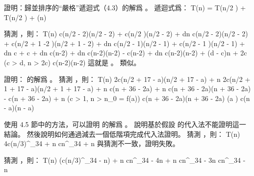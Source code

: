 \startEXERCISE
證明：歸並排序的“嚴格”遞迴式（4.3）的解爲 。
\stopEXERCISE
\startANSWER
遞迴式爲：
\startformula
T(n) = T(\lfloor n/2 \rfloor) + T(\lceil n/2 \rceil) + \Theta(n)
\stopformula

猜測 ，則：
\startformula\startalign
\NC T(n) \NC \le c(\lfloor n/2 \rfloor - 2)\lg(\lfloor n/2 \rfloor - 2) + c(\lceil n/2  )\lg(\lceil n/2 \rceil - 2) + dn \NR
\NC      \NC \le c(n/2 - 2)\lg(n/2 - 2) + c(n/2 + 1 -2 )\lg(n/2 + 1 - 2) + dn \NR
\NC      \NC \le c(n/2 - 1)\lg(n/2 - 1) + c(n/2 - 1 )\lg(n/2 - 1) + dn \NR
\NC      \NC \le c\lg{} + c\lg{} + dn \NR
\NC      \NC \le c(n-2)\lg{} + dn \NR
\NC      \NC \le c(n-2)\lg(n-2) - c(n-2) + dn \NR
\NC      \NC \le c(n-2)\lg(n-2) + (d - c)n + 2c \qquad (c > d, n > 2c)\NR
\NC      \NC \le c(n-2)\lg(n-2) \NR
\stopalign\stopformula
這就是 。  類似。
\stopANSWER

\startEXERCISE
證明：  的解爲 。
\stopEXERCISE
\startANSWER
猜測 ，則：
\startformula\startmathalignment[n=3]
\NC T(n) \NC \le 2c(\lfloor n/2 \rfloor + 17 - a)\lg(\lfloor n/2 \rfloor + 17 - a) + n \NC \NR
\NC      \NC \le 2c(n/2 + 1 + 17 - a)\lg(n/2 + 1 + 17 - a) + n \NC \NR
\NC      \NC \le c(n + 36 - 2a)\lg{} + n \NC \NR
\NC      \NC \le c(n + 36 - 2a)\lg(n + 36 - 2a) - c(n + 36 - 2a) + n \qquad\NC (c > 1, n > n_0 = f(a))\NR
\NC      \NC \le c(n + 36 - 2a)\lg(n + 36 - 2a)                      \NC (a ) \NR
\NC      \NC \le c(n - a)\lg(n - a) \NC \NR
\stopmathalignment\stopformula
\stopANSWER

\startEXERCISE
使用 4.5 節中的方法，可以證明  的解爲 。
說明基於假設  的代入法不能證明這一結論。
然後說明如何通過減去一個低階項完成代入法證明。
\stopEXERCISE
\startANSWER
猜測 ，則：
\startformula\startmathalignment
\NC T(n) \NC \le 4c(n/3)^{\log_3{4}} + n \NR
\NC      \NC \le cn^{\log_3{4}} + n \NR
\stopmathalignment\stopformula
與猜測不一致，證明失敗。

猜測 ，則：
\startformula\startmathalignment
\NC T(n) \NC {}\Big(c(n/3)^{\log_3{4}} - n\Big) + n \NR
\NC      \NC \le cn^{\log_3{4}} - 4n + n \NR
\NC      \NC \le cn^{\log_3{4}} - 3n \NR
\NC      \NC \le cn^{\log_3{4}} - n \NR
\stopmathalignment\stopformula
\stopANSWER

